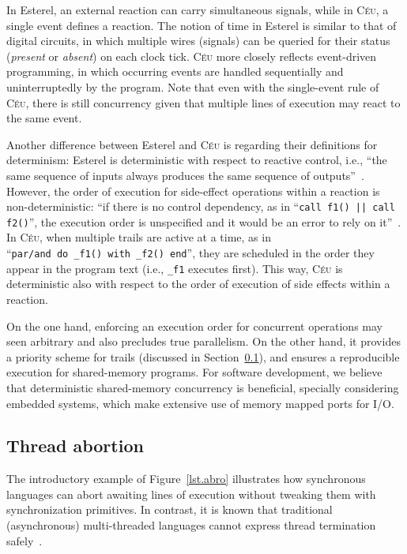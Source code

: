 \documentclass{acm_proc_article-sp}
\newcommand{\CEU}{\textsc{C\'{e}u}\xspace}
\newcommand{\code}[1] {{\small{\texttt{#1}}}}
\newcommand{\1}{\;}
\newcommand{\2}{\;\;}
\newcommand{\3}{\;\;\;}
\newcommand{\5}{\;\;\;\;\;}
\begin{document}
In Esterel, an external reaction can carry simultaneous signals, while in \CEU, 
a single event defines a reaction.
%
The notion of time in Esterel is similar to that of digital circuits, in which 
multiple wires (signals) can be queried for their status (\emph{present} or 
\emph{absent}) on each clock tick.
%
\CEU more closely reflects event-driven programming, in which occurring events 
are handled sequentially and uninterruptedly by the program.
%
Note that even with the single-event rule of \CEU, there is still concurrency 
given that multiple lines of execution may react to the same event.

Another difference between Esterel and \CEU is regarding their definitions for 
determinism:
%
Esterel is deterministic with respect to reactive control, i.e., ``the same 
sequence of inputs always produces the same sequence of 
outputs''~\cite{esterel.primer}.
However, the order of execution for side-effect operations within a reaction is 
non-deterministic: ``if there is no control dependency, as in ``\code{call f1() 
|| call f2()}'', the execution order is unspecified and it would be an error to 
rely on it''~\cite{esterel.primer}.
%
In \CEU, when multiple trails are active at a time, as in
``\code{par/and~do~\_f1()~with~\_f2()~end}'', they are scheduled in the order 
they appear in the program text (i.e., \code{\_f1} executes first).
%
This way, \CEU is deterministic also with respect to the order of execution of 
side effects within a reaction.

On the one hand, enforcing an execution order for concurrent operations may 
seen arbitrary and also precludes true parallelism.
On the other hand, it provides a priority scheme for trails (discussed in 
Section~\ref{sec.ceu.abrt}), and ensures a reproducible execution for 
shared-memory programs.
%
For software development, we believe that deterministic shared-memory 
concurrency is beneficial, specially considering embedded systems, which make 
extensive use of memory mapped ports for I/O.

\subsection{Thread abortion}
\label{sec.ceu.abrt}

The introductory example of Figure~\ref{lst.abro} illustrates how synchronous 
languages can abort awaiting lines of execution without tweaking them with 
synchronization primitives.
In contrast, it is known that traditional (asynchronous) multi-threaded 
languages cannot express thread termination safely~\cite{esterel.preemption}.
\end{document}
